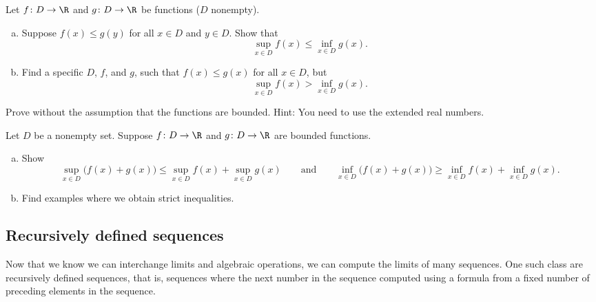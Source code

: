 \documentclass[12pt]{book}
\begin{document}
\begin{exercise}
Let 
$f \colon D \to \R$ and $g \colon D \to \R$ be functions ($D$ nonempty).
\begin{enumerate}[a)]
%
\item
Suppose 
$f(x) \leq g(y)$ for all $x \in D$ and $y \in D$.
Show that
\begin{equation*}
\sup_{x\in D} f(x) \leq \inf_{x\in D} g(x) .
\end{equation*}
%
\item
Find a specific $D$, $f$, and $g$, such that
$f(x) \leq g(x)$ for all $x \in D$, but
\begin{equation*}
\sup_{x\in D} f(x) > \inf_{x\in D} g(x) .
\end{equation*}
\end{enumerate}
\end{exercise}

\begin{exercise}
Prove  without the assumption that
the functions are bounded.
Hint: You need to use the extended real
numbers.
\end{exercise}

\begin{exercise} \label{exercise:sumofsup}
Let $D$ be a nonempty set.
Suppose $f \colon D \to \R$ and $g \colon D \to \R$ are bounded functions.
\begin{enumerate}[a)]
\item Show 
\begin{equation*}
\sup_{x\in D} \bigl(f(x) + g(x) \bigr) \leq
\sup_{x\in D} f(x)
+
\sup_{x\in D} g(x)
\qquad \text{and} \qquad
\inf_{x\in D} \bigl(f(x) + g(x) \bigr) \geq
\inf_{x\in D} f(x)
+
\inf_{x\in D} g(x) .
\end{equation*}
\item Find examples where we obtain strict inequalities.
\end{enumerate}
\end{exercise}

\subsection*{Recursively defined sequences}

Now that we know we can interchange limits and algebraic operations, we can
compute the limits of many sequences.
One such class are recursively defined sequences, that is, sequences where
the next number in the sequence computed using a formula from a fixed number
of preceding elements in the sequence.
\end{document}
